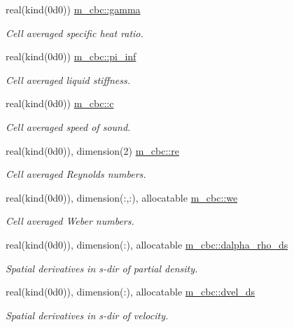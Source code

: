 \begin{DoxyCompactItemize}
real(kind(0d0)) \hyperlink{namespacem__cbc_aa657c2e47d8b48e2648c12a454ceec96}{m\+\_\+cbc\+::gamma}
\begin{DoxyCompactList}\small\item\em Cell averaged specific heat ratio. \end{DoxyCompactList}\item 
real(kind(0d0)) \hyperlink{namespacem__cbc_a2187e55d648bf7c40be489b5a2b75ca7}{m\+\_\+cbc\+::pi\+\_\+inf}
\begin{DoxyCompactList}\small\item\em Cell averaged liquid stiffness. \end{DoxyCompactList}\item 
real(kind(0d0)) \hyperlink{namespacem__cbc_a982b2364cfaa61896b8143231fc9e380}{m\+\_\+cbc\+::c}
\begin{DoxyCompactList}\small\item\em Cell averaged speed of sound. \end{DoxyCompactList}\item 
real(kind(0d0)), dimension(2) \hyperlink{namespacem__cbc_af36bd73bae305dd791c6da0a37d2f6f8}{m\+\_\+cbc\+::re}
\begin{DoxyCompactList}\small\item\em Cell averaged Reynolds numbers. \end{DoxyCompactList}\item 
real(kind(0d0)), dimension(\+:,\+:), allocatable \hyperlink{namespacem__cbc_a532334846efcbbca82ab11f26e28c5f7}{m\+\_\+cbc\+::we}
\begin{DoxyCompactList}\small\item\em Cell averaged Weber numbers. \end{DoxyCompactList}\item 
real(kind(0d0)), dimension(\+:), allocatable \hyperlink{namespacem__cbc_a5d23c9c92bd474ce0a0d5af3c1f37cb8}{m\+\_\+cbc\+::dalpha\+\_\+rho\+\_\+ds}
\begin{DoxyCompactList}\small\item\em Spatial derivatives in s-\/dir of partial density. \end{DoxyCompactList}\item 
real(kind(0d0)), dimension(\+:), allocatable \hyperlink{namespacem__cbc_ac2bd4c0c73cfb0582f003473d0ec4f7f}{m\+\_\+cbc\+::dvel\+\_\+ds}
\begin{DoxyCompactList}\small\item\em Spatial derivatives in s-\/dir of velocity. \end{DoxyCompactList}\item 

\end{DoxyCompactItemize}
